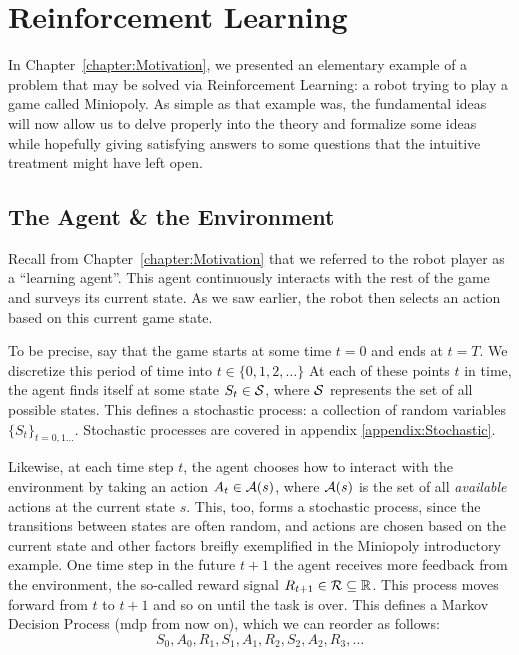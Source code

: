 \chapter{Reinforcement Learning}
\label{chapter:ReinforcementLearning}

In Chapter~\ref{chapter:Motivation}, we presented an elementary example of a
problem that may be solved via Reinforcement Learning: a robot trying to play a
game called Miniopoly. As simple as that example was, the fundamental ideas will
now allow us to delve properly into the theory and formalize some ideas while
hopefully giving satisfying answers to some questions that the intuitive
treatment might have left open.

\section{The Agent \& the Environment}

Recall from Chapter~\ref{chapter:Motivation} that we referred to the robot
player as a ``learning agent''. This agent continuously interacts with the rest
of the game and surveys its current state. As we saw earlier, the robot then
selects an action based on this current game state.

To be precise, say that the game starts at some time $t=0$ and ends at $t=T$. We
discretize this period of time into $t \in \{0, 1, 2, \ldots \}$ At each of
these points $t$ in time, the agent finds itself at some state $S_t \in
\mathcal{S}$, where $\mathcal{S}$ represents the set of all possible states. This
defines a stochastic process: a collection of random variables $\{ S_t \}_{t = 0, 1
\ldots}$. Stochastic processes are covered in appendix
\ref{appendix:Stochastic}.

Likewise, at each time step $t$, the agent chooses how to interact with the
environment by taking an action $A_t \in \mathcal{A}(s)$, where $\mathcal{A}(s)$ is
the set of all \textit{available} actions at the current state $s$. This, too,
forms a stochastic process, since the transitions between states are often
random, and actions are chosen based on the current state and other factors
breifly exemplified in the Miniopoly introductory example. One time step in the
future $t+1$ the agent receives more feedback from the environment, the
so-called reward signal $R_{t+1} \in \mathcal{R} \subseteq \mathbb{R}$. This process moves
forward from $t$ to $t+1$ and so on until the task is over. This defines a
Markov Decision Process (\acs{mdp} from now on), which we can reorder as
follows:
\begin{equation}
	\label{eq:mdp-succession}
	S_0, A_0, R_1, S_1, A_1, R_2, S_2, A_2, R_3, \ldots
\end{equation}

